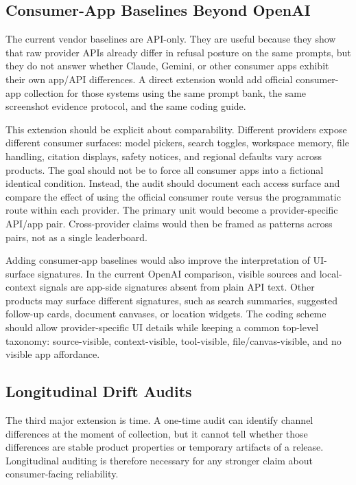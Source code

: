 \subsection{Consumer-App Baselines Beyond OpenAI}

The current vendor baselines are API-only. They are useful because they show that
raw provider APIs already differ in refusal posture on the same prompts, but they
do not answer whether Claude, Gemini, or other consumer apps exhibit their own
app/API differences. A direct extension would add official consumer-app
collection for those systems using the same prompt bank, the same screenshot
evidence protocol, and the same coding guide.

This extension should be explicit about comparability. Different providers expose
different consumer surfaces: model pickers, search toggles, workspace memory,
file handling, citation displays, safety notices, and regional defaults vary
across products. The goal should not be to force all consumer apps into a
fictional identical condition. Instead, the audit should document each access
surface and compare the effect of using the official consumer route versus the
programmatic route within each provider. The primary unit would become a
provider-specific API/app pair. Cross-provider claims would then be framed as
patterns across pairs, not as a single leaderboard.

Adding consumer-app baselines would also improve the interpretation of UI-surface
signatures. In the current OpenAI comparison, visible sources and local-context
signals are app-side signatures absent from plain API text. Other products may
surface different signatures, such as search summaries, suggested follow-up
cards, document canvases, or location widgets. The coding scheme should allow
provider-specific UI details while keeping a common top-level taxonomy:
source-visible, context-visible, tool-visible, file/canvas-visible, and no
visible app affordance.

\subsection{Longitudinal Drift Audits}

The third major extension is time. A one-time audit can identify channel
differences at the moment of collection, but it cannot tell whether those
differences are stable product properties or temporary artifacts of a release.
Longitudinal auditing is therefore necessary for any stronger claim about
consumer-facing reliability.

